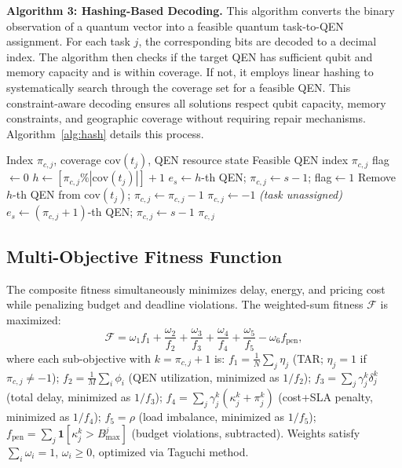 \documentclass[10pt,twocolumn]{article}
\begin{document}
\textbf{Algorithm 3: Hashing-Based Decoding.}
This algorithm converts the binary observation of a quantum vector into a feasible quantum task-to-QEN assignment. For each task $j$, the corresponding bits are decoded to a decimal index. The algorithm then checks if the target QEN has sufficient qubit and memory capacity and is within coverage. If not, it employs linear hashing to systematically search through the coverage set for a feasible QEN. This constraint-aware decoding ensures all solutions respect qubit capacity, memory constraints, and geographic coverage without requiring repair mechanisms. Algorithm~\ref{alg:hash} details this process.

\begin{algorithm}[t]
\caption{Hashing-Based Decoding}
\label{alg:hash}
\small
\begin{algorithmic}[1]
\REQUIRE Index $\pi_{c,j}$, coverage $\mathrm{cov}(t_j)$, QEN resource state
\ENSURE Feasible QEN index $\pi_{c,j}$
    \STATE flag$\leftarrow 0$
        \STATE $h\leftarrow[\pi_{c,j}\%|\mathrm{cov}(t_j)|]+1$
            \STATE $e_s\leftarrow h$-th QEN;\; $\pi_{c,j}\leftarrow s{-}1$;\; flag$\leftarrow 1$
        \ELSE
            \STATE Remove $h$-th QEN from $\mathrm{cov}(t_j)$;\; $\pi_{c,j}\leftarrow\pi_{c,j}{-}1$
        \ENDIF
    \ENDWHILE
        \STATE $\pi_{c,j}\leftarrow -1$ \hfill\textit{(task unassigned)}
    \ENDIF
\ELSE
    \STATE $e_s\leftarrow(\pi_{c,j}{+}1)$-th QEN;\; $\pi_{c,j}\leftarrow s{-}1$
\ENDIF
\RETURN $\pi_{c,j}$
\end{algorithmic}
\end{algorithm}

\subsection{Multi-Objective Fitness Function}
The composite fitness simultaneously minimizes delay, energy, and pricing cost while penalizing budget and deadline violations. The weighted-sum fitness $\mathcal{F}$ is maximized:
\begin{equation}
\mathcal{F}=\omega_1 f_1+\frac{\omega_2}{f_2}+\frac{\omega_3}{f_3}+\frac{\omega_4}{f_4}+\frac{\omega_5}{f_5}-\omega_6 f_{\mathrm{pen}},
\label{eq:fitness}
\end{equation}
where each sub-objective with $k=\pi_{c,j}+1$ is: $f_1=\frac{1}{N}\sum_j\eta_j$ (TAR; $\eta_j=1$ if $\pi_{c,j}\ne-1$); $f_2=\frac{1}{M}\sum_i\phi_i$ (QEN utilization, minimized as $1/f_2$); $f_3=\sum_j\gamma^k_j\delta^k_j$ (total delay, minimized as $1/f_3$); $f_4=\sum_j\gamma^k_j(\kappa^k_j+\pi^k_j)$ (cost+SLA penalty, minimized as $1/f_4$); $f_5=\rho$ (load imbalance, minimized as $1/f_5$); $f_{\mathrm{pen}}=\sum_j\mathbf{1}[\kappa^k_j>B^j_{\mathrm{max}}]$ (budget violations, subtracted). Weights satisfy $\sum_i\omega_i=1$, $\omega_i\ge0$, optimized via Taguchi method.
\end{document}

